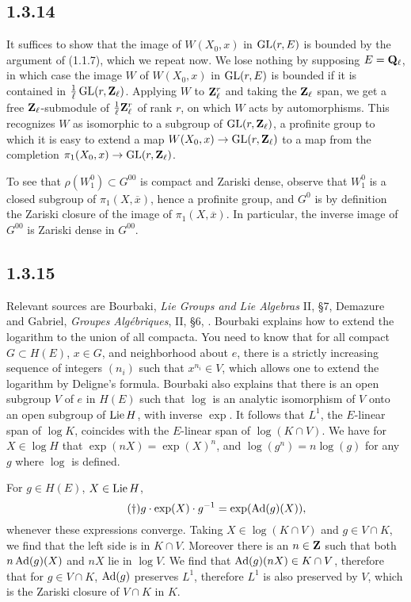 \documentclass[deligne.tex]{subfiles}
\begin{document}
\subsection*{1.3.14} It suffices to show that the image of $W(X_0,x)$ in
$\operatorname{GL}(r,E)$ is bounded by the argument of (1.1.7), which we repeat now.
We lose nothing by supposing $E=\mathbf{Q}_\ell$, in which case the image $W$ of 
$W(X_0,x)$ in $\operatorname{GL}(r,E)$ is bounded if it is contained in
$\frac1\ell\operatorname{GL}(r,\mathbf{Z}_\ell)$. Applying $W$ to $\mathbf{Z}_\ell^r$ and taking the
$\mathbf{Z}_\ell$ span, we get a free $\mathbf{Z}_\ell$-submodule of
$\frac1\ell\mathbf{Z}_\ell^r$ of rank $r$, on which $W$ acts by automorphisms.
This recognizes $W$ as isomorphic to a subgroup of $\operatorname{GL}(r,\mathbf{Z}_\ell)$, a
profinite group to which it is easy to extend a map
$W(X_0,x)\rightarrow\operatorname{GL}(r,\mathbf{Z}_\ell)$ to a map from the completion
$\pi_1(X_0,x)\rightarrow\operatorname{GL}(r,\mathbf{Z}_\ell)$.

To see that $\rho(W_1^0)\subset G^{00}$ is compact and Zariski dense, 
observe that $W_1^0$ is a closed subgroup of $\pi_1(X,\overline x)$, hence a 
profinite group, and $G^0$ is by definition the Zariski closure of the image 
of $\pi_1(X,\overline x)$. In particular, the inverse image of $G^{00}$ is
Zariski dense in $G^{00}$.

\subsection*{1.3.15}
Relevant sources are Bourbaki, \emph{Lie Groups and Lie Algebras} II, \S7,
Demazure and Gabriel, \emph{Groupes Algébriques}, II, \S6,
\cite[10, 14d]{Milne}.
Bourbaki explains how to extend the logarithm to the union of all compacta.
You need to know that for all compact $G\subset H(E)$, $x\in G$, and
neighborhood about $e$, there is a strictly increasing sequence of integers 
$(n_i)$ such that $x^{n_i}\in V$, which allows one to extend the logarithm
by Deligne's formula. Bourbaki also explains that there is an open
subgroup $V$ of $e$ in $H(E)$ such that $\log$ is an analytic
isomorphism of $V$ onto an open subgroup of $\operatorname{Lie} H$, with inverse $\exp$.
It follows that $L^1$, the $E$-linear span of $\log K$, coincides with the
$E$-linear span of $\log(K\cap V)$. We have for $X\in\log H$ that
$\exp(nX)=\exp(X)^n$, and $\log(g^n)=n\log(g)$ for any $g$ where $\log$ is 
defined.

For $g\in H(E)$, $X\in\operatorname{Lie} H$,
\begin{equation*}\tag{$\dagger$}
g\cdot\exp(X)\cdot g^{-1}=\exp(\operatorname{Ad}(g)(X)),\end{equation*}
whenever these expressions converge.
Taking $X\in\log(K\cap V)$ and $g\in V\cap K$, we find that the left side
is in $K\cap V$. Moreover there is an $n\in\mathbf{Z}$ such that both $n\operatorname{Ad}(g)(X)$
and $nX$ lie in $\log V$. We find that $\operatorname{Ad}(g)(nX)\in K\cap V$, therefore
that for $g\in V\cap K$, $\operatorname{Ad}(g)$ preserves $L^1$, therefore $L^1$ is also 
preserved by $V$, which is the Zariski closure of $V\cap K$ in $K$.
\end{document}
